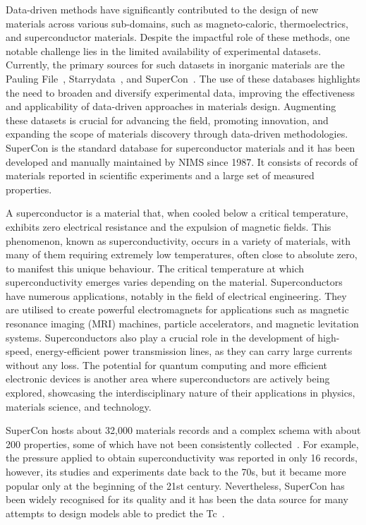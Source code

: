 Data-driven methods have significantly contributed to the design of new materials across various sub-domains, such as magneto-caloric, thermoelectrics, and superconductor materials. Despite the impactful role of these methods, one notable challenge lies in the limited availability of experimental datasets. 
Currently, the primary sources for such datasets in inorganic materials are the Pauling File~\cite{Blokhin2018ThePF_paulingFile}, Starrydata~\cite{katsura2019data}, and SuperCon~\cite{ishii2023structuring}. 
The use of these databases highlights the need to broaden and diversify experimental data, improving the effectiveness and applicability of data-driven approaches in materials design. Augmenting these datasets is crucial for advancing the field, promoting innovation, and expanding the scope of materials discovery through data-driven methodologies.
SuperCon is the standard database for superconductor materials and it has been developed and manually maintained by NIMS since 1987. 
It consists of records of materials reported in scientific experiments and a large set of measured properties. 

A superconductor is a material that, when cooled below a critical temperature, exhibits zero electrical resistance and the expulsion of magnetic fields. This phenomenon, known as superconductivity, occurs in a variety of materials, with many of them requiring extremely low temperatures, often close to absolute zero, to manifest this unique behaviour. The critical temperature at which superconductivity emerges varies depending on the material. Superconductors have numerous applications, notably in the field of electrical engineering. They are utilised to create powerful electromagnets for applications such as magnetic resonance imaging (MRI) machines, particle accelerators, and magnetic levitation systems. Superconductors also play a crucial role in the development of high-speed, energy-efficient power transmission lines, as they can carry large currents without any loss. The potential for quantum computing and more efficient electronic devices is another area where superconductors are actively being explored, showcasing the interdisciplinary nature of their applications in physics, materials science, and technology.

SuperCon hosts about 32,000 materials records and a complex schema with about 200 properties, some of which have not been consistently collected~\cite{sommer20223dsc}. 
For example, the pressure applied to obtain superconductivity was reported in only 16 records, however, its studies and experiments date back to the 70s, but it became more popular only at the beginning of the 21st century.  
Nevertheless, SuperCon has been widely recognised for its quality and it has been the data source for many attempts to design models able to predict the Tc~\cite{stanev_machine_2017, le2020critical, Hamlin2019SuperconductivityNR}. 

